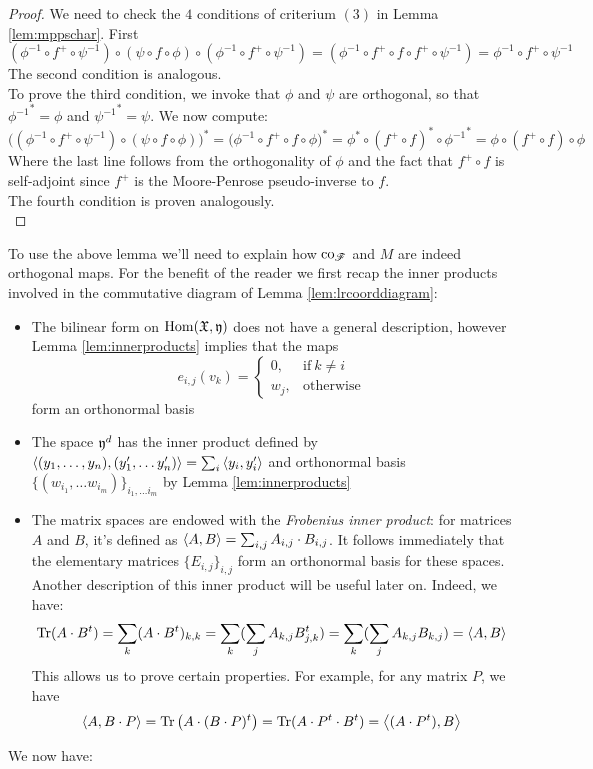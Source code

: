 \begin{proof}
	We need to check the $4$ conditions of criterium $(3)$ in Lemma \ref{lem:mppschar}. First \[(\phi^{-1}\circ f^+ \circ \psi^{-1})\circ (\psi \circ f\circ \phi)\circ (\phi^{-1}\circ f^+ \circ \psi^{-1})=(\phi^{-1}\circ f^+\circ f\circ f^+\circ  \psi^{-1}) = \phi^{-1}\circ f^+ \circ \psi^{-1}\]
	The second condition is analogous.\\
	To prove the third condition, we invoke that $\phi$ and $\psi$ are orthogonal, so that ${\phi^{-1}}^*=\phi$ and ${\psi^{-1}}^*=\psi$. We now compute:
	\[
	\bigg((\phi^{-1}\circ f^+ \circ \psi^{-1})\circ (\psi \circ f\circ \phi) \bigg)^*=\bigg(\phi^{-1}\circ f^+ \circ f \circ \phi \bigg)^*=\phi^*\circ (f^+\circ f)^* \circ {\phi^{-1}}^*=\phi\circ (f^+\circ f)\circ \phi
	\]
	Where the last line follows from the orthogonality of $\phi$ and the fact that $f^+\circ f$ is self-adjoint since $f^+$ is the Moore-Penrose pseudo-inverse to $f$.\\
	The fourth condition is proven analogously.\\
\end{proof}

To use the above lemma we'll need to explain how $\co_{\r{F}}$ and $M$ are indeed orthogonal maps. For the benefit of the reader we first recap the inner products involved in the commutative diagram of Lemma \ref{lem:lrcoorddiagram}:
\begin{itemize}
	\item The bilinear form on $\operatorname{Hom}(\mathfrak{X},\mathfrak{y})$ does not have a general description, however  Lemma \ref{lem:innerproducts} implies that the maps 
	 \begin{equation}
	e_{i,j}(v_k)=
	\begin{cases}
	0, & \text{if}\ k \neq i  \\
	w_j, & \text{otherwise}
	\end{cases}
	\end{equation}
	form an orthonormal basis
	\item The space $\mathfrak{y}^d$ has the inner product defined by $\left\langle (y_1,\ldots, y_n ),(y'_1,\ldots y'_n)\right\rangle=\sum_i \left\langle y_i,y'_i\right\rangle$ and orthonormal basis $\big\{(w_{i_1},\ldots w_{i_m})\big\}_{i_1,\ldots i_m}$ by Lemma \ref{lem:innerproducts}
	\item The  matrix spaces are endowed with the \emph{Frobenius inner product}: for matrices $A$ and $B$, it's defined as $\left\langle A,B\right\rangle=\sum_{i,j} A_{i,j}\cdot B_{i,j}$. It follows immediately that the elementary matrices $\big\{E_{i,j}\big\}_{i,j}$ form an orthonormal basis for these spaces.\\
	Another description of this inner product will be useful later on. Indeed, we have:
	\[
	\operatorname{Tr}(A\cdot B^t)=\sum_k(A\cdot B^t)_{k,k}=\sum_k(\sum_j A_{k,j}B^t_{j,k})=\sum_k(\sum_j A_{k,j}B_{k,j})=\left\langle A,B\right\rangle
	\]
	This allows us to prove certain properties. For example, for any matrix $P$, we have
	\[
	\left\langle A,B\cdot P\right\rangle=\operatorname{Tr}\big(A\cdot (B\cdot P)^t\big)=\operatorname{Tr}(A\cdot P^t\cdot B^t)=\left\langle (A\cdot P^t),B\right\rangle
	\]
\end{itemize}
We now have:

